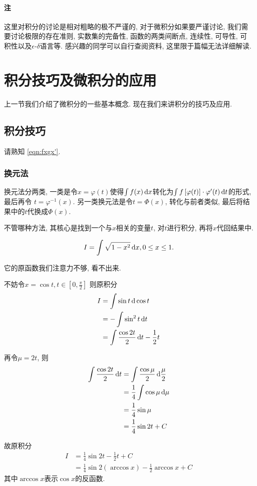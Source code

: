 \paragraph{注}
这里对积分的讨论是相对粗略的极不严谨的, 对于微积分如果要严谨讨论,
我们需要讨论极限的存在准则,
实数集的完备性, 函数的两类间断点, 连续性, 可导性, 可积性以及$\epsilon \text{-} \delta $语言等.
感兴趣的同学可以自行查阅资料, 这里限于篇幅无法详细解读.

\section{积分技巧及微积分的应用}
上一节我们介绍了微积分的一些基本概念. 现在我们来讲积分的技巧及应用.

\subsection{积分技巧}
请熟知 \cref{eqn:fxgx'}.
\subsubsection*{换元法}
换元法分两类, 一类是令$x = \varphi (t)$使得$\int f(x)\mathop{}\!\mathrm{d} x $转化为$\int
f\left[\varphi (t)\right] \cdot \varphi '(t) \mathop{}\!\mathrm{d} t$的形式,
最后再令 $t = \varphi ^{-1} (x) $.
另一类换元法是令$t=\Phi (x)$, 转化与前者类似, 最后将结果中的$t$代换成$\Phi (x)$.

不管哪种方法, 其核心是找到一个与$x$相关的变量$t$, 对$t$进行积分, 再将$x$代回结果中.

\begin{example}
  \[
    I = \int \sqrt{1-x^{2} } \mathop{}\!\mathrm{d} x, 0 \leq x \leq 1
  .\]

  它的原函数我们注意力不够, 看不出来.

  不妨令$x = \cos t,t \in \left[0,\frac{\pi}{2} \right]$
  则原积分
  \begin{align*}
    I & = \int  \sin t \mathop{}\!\mathrm{d} \cos t                        \\
    & = - \int \sin ^{2} t \mathop{}\!\mathrm{d} t                       \\
    & = \int \frac{ \cos 2t }{2} \mathop{}\!\mathrm{d} t - \frac{1}{2} t
  \end{align*}

  再令$\mu  = 2t$, 则
  \begin{align*}
    \int \frac{\cos 2t}{2}\mathop{}\!\mathrm{d} t & = \int \frac{\cos  \mu}{2} \mathop{}\!\mathrm{d}
    \frac{\mu}{2}                                                       \\
    & = \frac{1}{4} \int \cos \mu \mathop{}\!\mathrm{d} \mu \\
    & = \frac{1}{4} \sin \mu               \\
    & = \frac{1}{4} \sin  2t + C
  \end{align*}

  故原积分
  \begin{align*}
    I & = \frac{1}{4} \sin  2t - \frac{1}{2}t +C                    \\
    & = \frac{1}{4} \sin 2(\arccos x ) - \frac{1}{2} \arccos x +C
  \end{align*}
  其中$\arccos x$表示$\cos x$的反函数.
\end{example}

